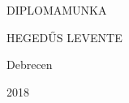 \documentclass{memoir}
\begin{document}
\begin{center}
\begin{vplace}[0.8]
\HUGE DIPLOMAMUNKA
\end{vplace}
\end{center}

\begin{flushright}
\begin{vplace}[0.7]
\LARGE HEGEDŰS LEVENTE
\end{vplace}
\end{flushright}

\LARGE{
\begin{center}
Debrecen

2018
\end{center}
}
\end{document}
